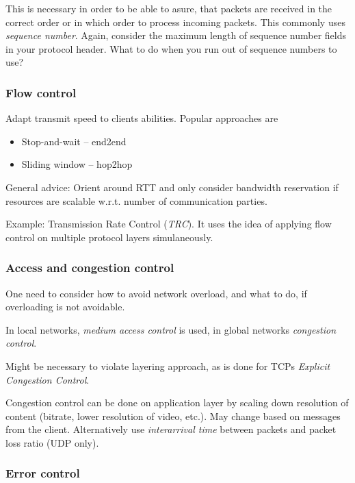 \documentclass[english]{panikzettel}
\begin{document}
	This is necessary in order to be able to asure, that packets are received in the correct order or in which order to process incoming packets.
	This commonly uses \textit{sequence number}.
	Again, consider the maximum length of sequence number fields in your protocol header.
	What to do when you run out of sequence numbers to use?

	\subsubsection{Flow control}
	\label{sssec-flow-control}
	
	Adapt transmit speed to clients abilities.
	Popular approaches are 
	\begin{itemize}
		\item Stop-and-wait – end2end
		\item Sliding window – hop2hop
	\end{itemize}

	General advice: Orient around RTT and only consider bandwidth reservation if resources are scalable w.r.t. number of communication parties.

	Example: Transmission Rate Control (\textit{TRC}).
	It uses the idea of applying flow control on multiple protocol layers simulaneously.

	\subsubsection{Access and congestion control}
	\label{sssec-access-and-congestion-control}
	
	One need to consider how to avoid network overload, and what to do, if overloading is not avoidable.

	In local networks, \textit{medium access control} is used, in global networks \textit{congestion control}.

	Might be necessary to violate layering approach, as is done for TCPs \textit{Explicit Congestion Control}.

	Congestion control can be done on application layer by scaling down resolution of content (bitrate, lower resolution of video, etc.).
	May change based on messages from the client. 
	Alternatively use \textit{interarrival time} between packets and packet loss ratio (UDP only).

	\subsubsection{Error control}
	\label{sss-error-control}
	
\end{document}
